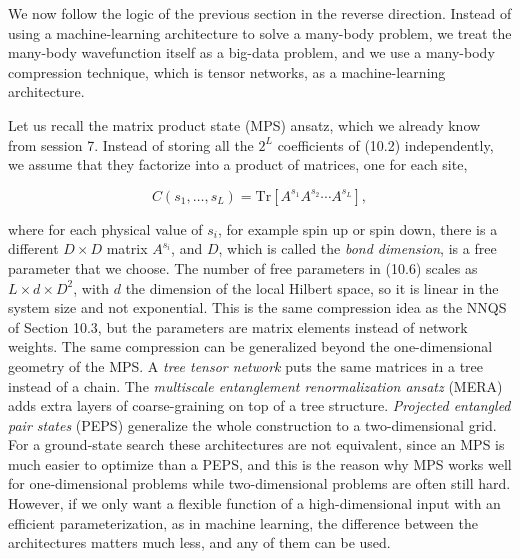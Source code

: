 We now follow the logic of the previous section in the reverse direction. Instead of using a
machine-learning architecture to solve a many-body problem, we treat the many-body wavefunction
itself as a big-data problem, and we use a many-body compression technique, which is tensor
networks, as a machine-learning architecture.

Let us recall the matrix product state (MPS) ansatz, which we already know from session 7. Instead
of storing all the $2^L$ coefficients of (10.2) independently, we assume that they factorize into a
product of matrices, one for each site,

\begin{equation}
C(s_1,\dots,s_L) = \mathrm{Tr}\left[A^{s_1} A^{s_2}\cdots A^{s_L}\right],
\end{equation}

where for each physical value of $s_i$, for example spin up or spin down, there is a different
$D\times D$ matrix $A^{s_i}$, and $D$, which is called the \emph{bond dimension}, is a free
parameter that we choose. The number of free parameters in (10.6) scales as $L \times d \times
D^2$, with $d$ the dimension of the local Hilbert space, so it is linear in the system size and not
exponential. This is the same compression idea as the NNQS of Section 10.3, but the parameters are
matrix elements instead of network weights. The same compression can be generalized beyond the
one-dimensional geometry of the MPS. A \emph{tree tensor network} puts the same matrices in a tree
instead of a chain. The \emph{multiscale entanglement renormalization ansatz} (MERA) adds extra layers of
coarse-graining on top of a tree structure. \emph{Projected entangled pair states} (PEPS)
generalize the whole construction to a two-dimensional grid. For a ground-state search these
architectures are not equivalent, since an MPS is much easier to optimize than a PEPS, and this is
the reason why MPS works well for one-dimensional problems while two-dimensional problems are often
still hard. However, if we only want a flexible function of a high-dimensional input with an
efficient parameterization, as in machine learning, the difference between the architectures
matters much less, and any of them can be used.

